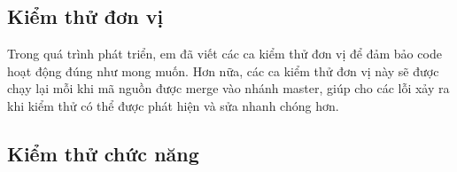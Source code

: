 \documentclass[./../main.tex]{subfiles}
\begin{document}
\subsection{Kiểm thử đơn vị}

Trong quá trình phát triển, em đã viết các ca kiểm thử đơn vị để đảm bảo code hoạt động đúng như mong muốn. Hơn nữa, các ca kiểm thử đơn vị này sẽ được chạy lại mỗi khi mã nguồn được merge vào nhánh master, giúp cho các lỗi xảy ra khi kiểm thử có thể được phát hiện và sửa nhanh chóng hơn.

\subsection{Kiểm thử chức năng}
\end{document}

